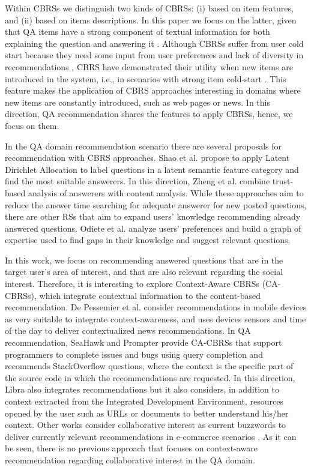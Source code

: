 \documentclass[preprint]{elsarticle}
\begin{document}
\begin{spacing}{1.5}
Within CBRSs we distinguish two kinds of CBRSs: (i) based on item features, and (ii) based on items descriptions. In this paper we focus on the latter, given that QA items have a strong component of textual information for both explaining the question and answering it \cite{Figueroa2016}. Although CBRSs suffer from user cold start because they need some input from user preferences and lack of diversity in recommendations \cite{Barragans2010}, CBRS have demonstrated their utility when new items are introduced in the system, i.e., in scenarios with strong item cold-start \cite{Aggarwal2016}. This feature makes the application of CBRS approaches interesting in domains where new items are constantly introduced, such as web pages or news. In this direction, QA recommendation shares the features to apply CBRSs, hence, we focus on them.

In the QA domain recommendation scenario there are several proposals for recommendation with CBRS approaches. Shao et al.\cite{Shao2017} propose to apply Latent Dirichlet Allocation to label questions in a latent semantic feature category and find the most suitable answerers. In this direction, Zheng et al. \cite{Zheng2015b} combine trust-based analysis of answerers with content analysis. While these approaches aim to reduce the answer time searching for adequate answerer for new posted questions, there are other RSs that aim to expand users' knowledge recommending already answered questions. Odiete et al. \cite{Odiete2017} analyze users' preferences and build a graph of expertise used to find gaps in their knowledge and suggest relevant questions.

In this work, we focus on recommending answered questions that are in the target user's area of interest, and that are also relevant regarding the social interest. Therefore, it is interesting to explore Context-Aware CBRSs (CA-CBRSs), which integrate contextual information to the content-based recommendation. De Pessemier et al. \cite{DePessemier2016} consider recommendations in mobile devices as very suitable to integrate context-awareness, and uses devices sensors and time of the day to deliver contextualized news recommendations. In QA recommendation, SeaHawk \cite{Ponzanelli2014} and Prompter \cite{Ponzanelli2014b} provide CA-CBRSs that support programmers to complete issues and bugs using query completion and recommends StackOverflow questions, where the context is the specific part of the source code in which the recommendations are requested. In this direction, Libra \cite{Ponzanelli2017} also integrates recommendations but it also considers, in addition to context extracted from the Integrated Development Environment, resources opened by the user such as URLs or documents to better understand his/her context. Other works consider collaborative interest as current buzzwords to deliver currently relevant recommendations in e-commerce scenarios \cite{Parikh2009}. As it can be seen, there is no previous approach that focuses on context-aware recommendation regarding collaborative interest in the QA domain.


\end{spacing}
\end{document}
